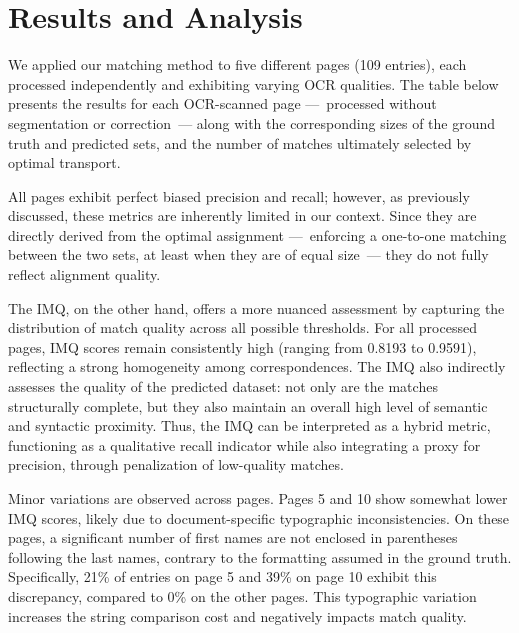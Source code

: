 \section{Results and Analysis}
\label{sec:results}

We applied our matching method to five different pages (109 entries), each processed independently and exhibiting varying OCR qualities. The table below presents the results for each OCR-scanned page ---~processed without segmentation or correction~--- along with the corresponding sizes of the ground truth and predicted sets, and the number of matches ultimately selected by optimal transport.

\begin{adjustbox}{width=\textwidth, center}

\end{adjustbox}
\newline

All pages exhibit perfect biased precision and recall; however, as previously discussed, these metrics are inherently limited in our context. Since they are directly derived from the optimal assignment ---~enforcing a one-to-one matching between the two sets, at least when they are of equal size~--- they do not fully reflect alignment quality.

The IMQ, on the other hand, offers a more nuanced assessment by capturing the distribution of match quality across all possible thresholds. For all processed pages, IMQ scores remain consistently high (ranging from 0.8193 to 0.9591), reflecting a strong homogeneity among correspondences. The IMQ also indirectly assesses the quality of the predicted dataset: not only are the matches structurally complete, but they also maintain an overall high level of semantic and syntactic proximity. Thus, the IMQ can be interpreted as a hybrid metric, functioning as a qualitative recall indicator while also integrating a proxy for precision, through penalization of low-quality matches.

Minor variations are observed across pages. Pages 5 and 10 show somewhat lower IMQ scores, likely due to document-specific typographic inconsistencies. On these pages, a significant number of first names are not enclosed in parentheses following the last names, contrary to the formatting assumed in the ground truth. Specifically, 21\% of entries on page 5 and 39\% on page 10 exhibit this discrepancy, compared to 0\% on the other pages. This typographic variation increases the string comparison cost and negatively impacts match quality.

